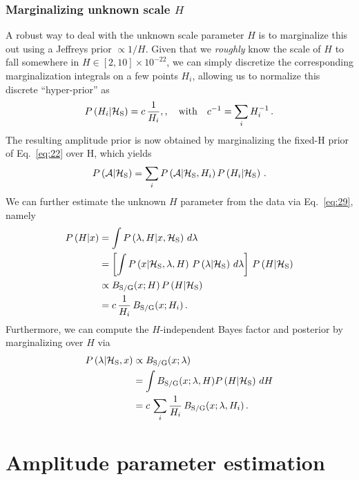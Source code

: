 \documentclass[aps,prd,onecolumn,notitlepage,nofootinbib,superscriptaddress,altaffilletter,floatfix]{revtex4-1}
\begin{document}
\subsubsection{Marginalizing unknown scale $H$}
\label{sec:marg-unkn-scale}

A robust way to deal with the unknown scale parameter $H$ is to marginalize this out using a Jeffreys prior $\propto 1/H$. Given that we
\emph{roughly} know the scale of $H$ to fall somewhere in $H\in{[2,10]}\times10^{-22}$, we can simply discretize the corresponding marginalization
integrals on a few points ${H_i}$, allowing us to normalize this discrete ``hyper-prior'' as
\begin{equation}
  \label{eq:44}
  P\left(H_i\middle|\mathcal{H}_{\mathrm{S}}\right) = c\,\frac{1}{H_i},,\quad\text{with}\quad c^{-1} = \sum_i H_i^{-1}\,.
\end{equation}
The resulting amplitude prior is now obtained by marginalizing the fixed-H prior of Eq.~\eqref{eq:22} over H, which yields
\begin{equation}
  \label{eq:52}
  P\left({\mathcal A}\middle|\mathcal{H}_{\mathrm{S}}\right) = \sum_i P\left({\mathcal A}\middle|\mathcal{H}_{\mathrm{S}},H_i\right) P\left(H_i\middle|\mathcal{H}_{\mathrm{S}}\right)\,.
\end{equation}
We can further estimate the unknown $H$ parameter from the data via Eq.~\eqref{eq:29}, namely
\begin{align}
  \label{eq:45}
  P\left(H\middle|x\right) &= \int P\left(\lambda,H\middle|x,\mathcal{H}_{\mathrm{S}}\right)\,d\lambda\\
  &= \left[\int P\left(x\middle|\mathcal{H}_{\mathrm{S}},\lambda,H\right)\,P\left(\lambda\middle|\mathcal{H}_{\mathrm{S}}\right)\,d\lambda\right]\,P\left(H\middle|\mathcal{H}_{\mathrm{S}}\right)\\
  &\propto B_{\mathrm{S/G}}(x;H)\,P\left(H\middle|\mathcal{H}_{\mathrm{S}}\right) \\
  &= c\,\frac{1}{H_i}\,B_{\mathrm{S/G}}(x;H_i)\,.
\end{align}
Furthermore, we can compute the $H$-independent Bayes factor and posterior by marginalizing over $H$ via
\begin{align}
  \label{eq:46}
  P\left(\lambda\middle|\mathcal{H}_{\mathrm{S}},x\right) &\propto B_{\mathrm{S/G}}(x;\lambda)\\
  &=\int B_{\mathrm{S/G}}(x;\lambda,H)P\left(H\middle|\mathcal{H}_{\mathrm{S}}\right)\,dH\\
  &= c\,\sum_i \frac{1}{H_i} \, B_{\mathrm{S/G}}(x;\lambda,H_i)\,.
\end{align}

\section{Amplitude parameter estimation}
\label{sec:parameter-estimation}
\end{document}
